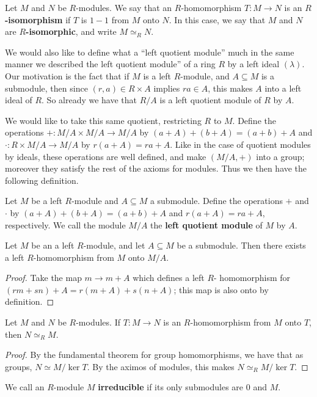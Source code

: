 \begin{definition}
    Let $M$ and  $N$ be  $R$-modules. We say that an  $R$-homomorphism  $T:M \rightarrow N$ is an
    \textbf{$R$-isomorphism} if $T$ is  $1-1$ from  $M$ onto  $N$. In this case, we say that  $M$
    and  $N$ are  \textbf{$R$-isomorphic}, and write $M \simeq_R N$.
\end{definition}

We would also like to define what a ``left quotient module'' much in the same manner we described
the left quotient module'' of a ring $R$ by a left ideal  $(\lambda)$. Our motivation is the fact
that if $M$ is a left $R$-module, and  $A \subseteq M$ is a submodule, then since  $(r,a) \in R
\times A$ implies $ra \in A$, this makes  $A$ into a left ideal of  $R$. So already we have that
$R/A$ is a left quotient module of  $R$ by  $A$.

We would like to take this same quotient, restricting $R$ to  $M$. Define the operations  $+:M/A
\times M/A \rightarrow M/A$ by $(a+A)+(b+A)=(a+b)+A$ and $\cdot:R \times M/A \rightarrow M/A$ by
$r(a+A)=ra+A$. Like in the case of quotient modules by ideals, these operations are well defined,
and make $(M/A,+)$ into a group; moreover they satisfy the rest of the axioms for modules. Thus we
then have the following definition.

\begin{definition}
    Let $M$ be a left $R$-module and  $A \subseteq M$ a submodule. Define the operations  $+$ and
    $\cdot$ by  $(a+A)+(b+A)=(a+b)+A$ and $r(a+A)=ra+A$, respectively. We call the module $M/A$ the
     \textbf{left quotient module} of $M$ by  $A$.
\end{definition}

\begin{lemma}
    Let $M$ be an a left $R$-module, and let $A \subseteq M$ be a submodule. Then there exists a
    left  $R$-homomorphism from  $M$ onto  $M/A$.
\end{lemma}
\begin{proof}
    Take the map $m \rightarrow m+A$ which defines a left $R$- homomorphism for
    $(rm+sn)+A=r(m+A)+s(n+A)$; this map is also onto by definition.
\end{proof}

\begin{theorem}
    Let $M$ and  $N$ be  $R$-modules. If $T:M \rightarrow N$ is an $R$-homomorphism from  
    $M$ onto  $T$, then $N \simeq_R M$.
\end{theorem}
\begin{proof}
    By the fundamental theorem for group homomorphisms, we have that as groups, $N \simeq
    M/\ker{T}$. By the aximos of modules, this makes $N \simeq_R M/\ker{T}$.
\end{proof}

\begin{definition}
    We call an $R$-module  $M$  \textbf{irreducible} if its only submodules are $0$ and  $M$.
\end{definition}
